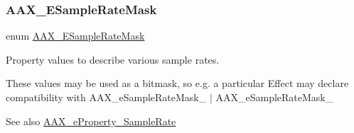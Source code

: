 \subsubsection{\texorpdfstring{AAX\_ESampleRateMask}{AAX\_ESampleRateMask}}
{\footnotesize\ttfamily enum \mbox{\hyperlink{a00491_a5bb98259de21d2c4d04a2d6010d757c7}{A\+A\+X\+\_\+\+E\+Sample\+Rate\+Mask}}}



Property values to describe various sample rates. 

These values may be used as a bitmask, so e.\+g. a particular Effect may declare compatibility with {\ttfamily A\+A\+X\+\_\+e\+Sample\+Rate\+Mask\+\_ $\vert$ A\+A\+X\+\_\+e\+Sample\+Rate\+Mask\+\_}

\begin{DoxySeeAlso}{See also}
\mbox{\hyperlink{a00662_a13e384f22825afd3db6d68395b79ce0dac5294e2feb18587d57b6ca0216a6bb1e}{A\+A\+X\+\_\+e\+Property\+\_\+\+Sample\+Rate}} 
\end{DoxySeeAlso}
